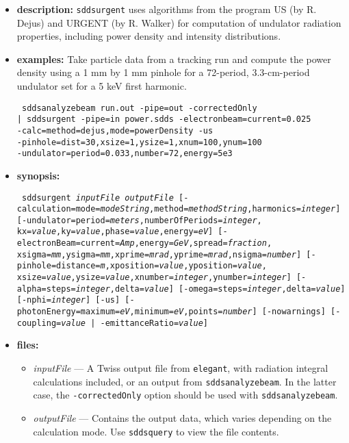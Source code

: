 \documentclass[11pt]{article}
\begin{document}
\begin{itemize}
\item {\bf description:} {\tt sddsurgent} uses algorithms from the program
US (by R. Dejus) and URGENT (by R. Walker) for computation of undulator
radiation properties, including power density and intensity distributions.

\item {\bf examples:}
Take particle data from a tracking run and compute the power density using a 1 mm by 1 mm pinhole
for a 72-period, 3.3-cm-period undulator set for a 5 keV first harmonic.
\begin{flushleft}{\tt
sddsanalyzebeam run.out -pipe=out -correctedOnly \\ 
 | sddsurgent -pipe=in power.sdds -electronbeam=current=0.025 \\
 -calc=method=dejus,mode=powerDensity -us \\
 -pinhole=dist=30,xsize=1,ysize=1,xnum=100,ynum=100 \\
 -undulator=period=0.033,number=72,energy=5e3
}\end{flushleft}

\item {\bf synopsis:}
\begin{flushleft}{\tt
sddsurgent {\em inputFile} {\em outputFile}
    [-calculation=mode={\em modeString},method={\em methodString},harmonics={\em integer}] 
    [-undulator=period={\em meters},numberOfPeriods={\em integer},
      kx={\em value},ky={\em value},phase={\em value},energy={\em eV}] 
    [-electronBeam=current={\em Amp},energy={\em GeV},spread={\em fraction},
      xsigma={\em mm},ysigma={\em mm},xprime={\em mrad},yprime={\em mrad},nsigma={\em number}] 
    [-pinhole=distance={\em m},xposition={\em value},yposition={\em value},
      xsize={\em value},ysize={\em value},xnumber={\em integer},ynumber={\em integer}]
    [-alpha=steps={\em integer},delta={\em value}] 
    [-omega=steps={\em integer},delta={\em value}] [-nphi={\em integer}] 
    [-us] [-photonEnergy=maximum={\em eV},minimum={\em eV},points={\em number}]
    [-nowarnings] [-coupling={\em value} | -emittanceRatio={\em value}] 
}\end{flushleft}

\item {\bf files:}
\begin{itemize}
\item {\em inputFile} --- A Twiss output file from {\tt elegant}, with radiation integral 
calculations included, or an output from {\tt sddsanalyzebeam}. In the latter case, the
{\tt -correctedOnly} option should be used with {\tt sddsanalyzebeam}.
\item {\em outputFile} --- Contains the output data, which varies depending on the calculation mode.
 Use {\tt sddsquery} to view the file contents.
\end{itemize}


\end{itemize}
\end{document}

